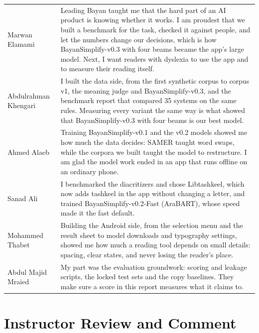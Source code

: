\documentclass[10pt,a4paper]{article}
\newcommand{\vOne}{BayanSimplify-v0.1}
\newcommand{\vTwoFast}{BayanSimplify-v0.2-Fast}
\newcommand{\vThree}{BayanSimplify-v0.3}
\begin{document}
\begin{fullwidth}
\vspace{3mm}
\renewcommand{\arraystretch}{1.35}
\begin{tabularx}{\linewidth}{|p{38mm}|L|}
\hline
{} &  \\ \hline
Marwan Elamami & Leading Bayan taught me that the hard part of an AI product is knowing
  whether it works. I am proudest that we built a benchmark for the task, checked it
  against people, and let the numbers change our decisions, which is how \vThree{} with
  four beams became the app's large model. Next, I want readers with dyslexia to use
  the app and to measure their reading itself. \\ \hline
Abdulrahman Khengari & I built the data side, from the first synthetic corpus to corpus v1,
  the meaning judge and \vThree{}, and the benchmark report that compared 35 systems
  on the same rules. Measuring every variant the same way is what showed that \vThree{}
  with four beams is our best model. \\ \hline
Ahmed Alaeb & Training \vOne{} and the v0.2 models showed me how much the data decides: SAMER taught
  word swaps, while the corpora we built taught the model to restructure. I am glad the
  model work ended in an app that runs offline on an ordinary phone. \\ \hline
Sanad Ali & I benchmarked the diacritizers and chose Libtashkeel, which now adds
  tashkeel in the app without changing a letter, and trained \vTwoFast{} (AraBART), whose
  speed made it the fast default. \\ \hline
Mohammed Thabet & Building the Android side, from the selection menu and the result sheet
  to model downloads and typography settings, showed me how much a reading tool depends
  on small details: spacing, clear states, and never losing the reader's place. \\ \hline
Abdul Majid Mraied & My part was the evaluation groundwork: scoring and leakage scripts, the
  locked test sets and the copy baselines. They make sure a score in this report
  measures what it claims to. \\ \hline
\end{tabularx}
\end{fullwidth}

\section{Instructor Review and Comment}
\end{document}
